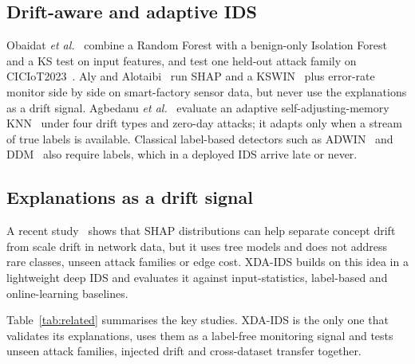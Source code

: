 \documentclass[conference]{IEEEtran}
\begin{document}
\subsection{Drift-aware and adaptive IDS}
Obaidat \textit{et al.}~\cite{obaidat2026} combine a Random Forest with a benign-only Isolation Forest~\cite{liu2008} and a KS test on input features, and test one held-out attack family on CICIoT2023~\cite{neto2023}. Aly and Alotaibi~\cite{aly2025} run SHAP and a KSWIN~\cite{raab2020} plus error-rate monitor side by side on smart-factory sensor data, but never use the explanations as a drift signal. Agbedanu \textit{et al.}~\cite{agbedanu2025} evaluate an adaptive self-adjusting-memory KNN~\cite{losing2016} under four drift types and zero-day attacks; it adapts only when a stream of true labels is available. Classical label-based detectors such as ADWIN~\cite{bifet2007} and DDM~\cite{gama2004} also require labels, which in a deployed IDS arrive late or never.

\subsection{Explanations as a drift signal}
A recent study~\cite{shapdrift} shows that SHAP distributions can help separate concept drift from scale drift in network data, but it uses tree models and does not address rare classes, unseen attack families or edge cost. XDA-IDS builds on this idea in a lightweight deep IDS and evaluates it against input-statistics, label-based and online-learning baselines.

Table~\ref{tab:related} summarises the key studies. XDA-IDS is the only one that validates its explanations, uses them as a label-free monitoring signal and tests unseen attack families, injected drift and cross-dataset transfer together.
\end{document}
